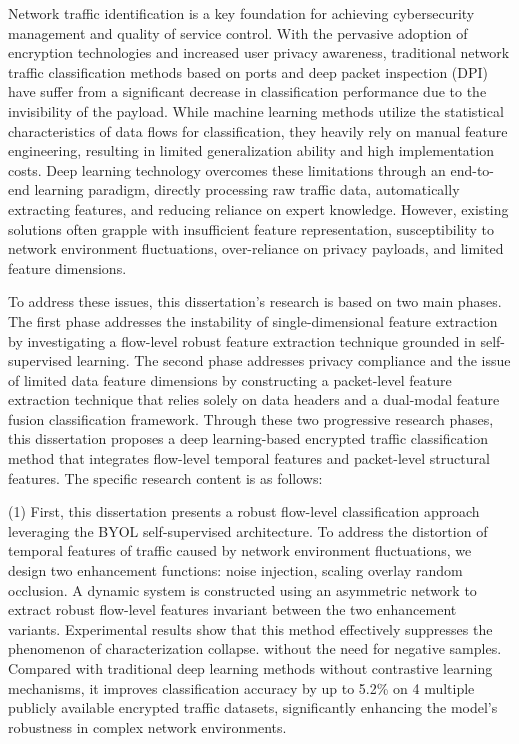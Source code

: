 \begin{abstract*}
  Network traffic identification is a key foundation for achieving cybersecurity management and quality of service control. With the pervasive adoption of encryption technologies and increased user privacy awareness, traditional network traffic classification methods based on ports and deep packet inspection (DPI) have suffer from a significant decrease in classification performance due to the invisibility of the payload. While machine learning methods utilize the statistical characteristics of data flows for classification, they heavily rely on manual feature engineering, resulting in limited generalization ability and high implementation costs. Deep learning technology overcomes these limitations through an end-to-end learning paradigm, directly processing raw traffic data, automatically extracting features, and reducing reliance on expert knowledge. However, existing solutions often grapple with insufficient feature representation, susceptibility to network environment fluctuations, over-reliance on privacy payloads, and limited feature dimensions. 
  
  To address these issues, this dissertation's research is based on two main phases. The first phase addresses the instability of single-dimensional feature extraction by investigating a flow-level robust feature extraction technique grounded in self-supervised learning. The second phase addresses privacy compliance and the issue of limited data feature dimensions by constructing a packet-level feature extraction technique that relies solely on data headers and a dual-modal feature fusion classification framework. Through these two progressive research phases, this dissertation proposes a deep learning-based encrypted traffic classification method that integrates flow-level temporal features and packet-level structural features. The specific research content is as follows:

  (1) First, this dissertation presents a robust flow-level classification approach leveraging the BYOL self-supervised architecture. To address the distortion of temporal features of traffic caused by network environment fluctuations, we design two enhancement functions: noise injection, scaling overlay random occlusion. A dynamic system is constructed using an asymmetric network to extract robust flow-level features invariant between the two enhancement variants. Experimental results show that this method effectively suppresses the phenomenon of characterization collapse. without the need for negative samples. Compared with traditional deep learning methods without contrastive learning mechanisms, it improves classification accuracy by up to 5.2\% on 4 multiple publicly available encrypted traffic datasets, significantly enhancing the model's robustness in complex network environments.


\end{abstract*}

